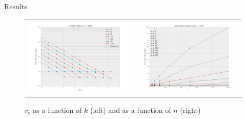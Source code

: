 \documentclass{beamer}
\begin{document}
\begin{frame}{Results}
\newcommand{\plotwidth}{2.2in} %
\begin{figure}
\begin{tabular}{cc}
\includegraphics[width=\plotwidth]{tratio1000.png} & \includegraphics[width=\plotwidth]{tratioarc1000.png}\\
\end{tabular}
\caption{$r_e$ as a function of $k$ (left) and as a function of $n$ (right) }
\label{fig:1000plot}
\end{figure}

\end{frame}
\end{document}
